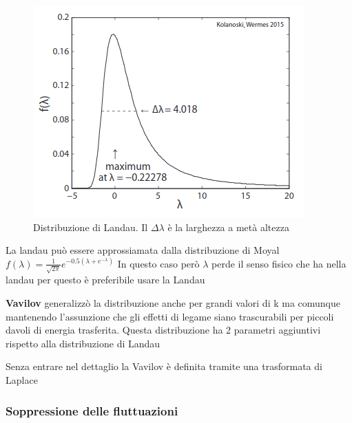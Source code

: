 \hspace{-20pt}
\begin{minipage}{0.48\textwidth}
    \begin{figure}[H]
        \centering
        \includegraphics[width=\textwidth,frame]{Chapters/images/Interazione_radiazione_materia/image-20220216191943021.png}
        \captionsetup{width=\textwidth}
        \caption{Distribuzione di Landau. Il $\Delta \lambda$ è la larghezza a metà altezza}
        \label{fig:landau}
    \end{figure}
\end{minipage} \hspace{0.2cm}
\begin{minipage}{0.5\textwidth}
\begin{remark}
    La landau può essere approssiamata dalla distribuzione di Moyal $f(\lambda)=\frac{1}{\sqrt{2\pi}}e^{-0.5(\lambda+e^{-\lambda})}$
In questo caso però $\lambda$ perde il senso fisico che ha nella landau per questo è preferibile usare la Landau
\end{remark}
\textbf{Vavilov}  generalizzò la distribuzione anche per grandi valori di k ma comunque mantenendo l'assunzione che gli effetti di legame siano trascurabili per piccoli davoli di energia trasferita.
Questa distribuzione ha 2 parametri aggiuntivi rispetto alla distribuzione di Landau
\end{minipage}
\begin{details}
    Senza entrare nel dettaglio la Vavilov è definita tramite una trasformata di Laplace
\end{details}
\subsubsection*{Soppressione delle fluttuazioni}

